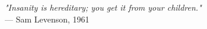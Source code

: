 \begin{flushright}
\emph{"Insanity is hereditary; you get it from your children."}\\
— Sam Levenson, 1961
\end{flushright}
